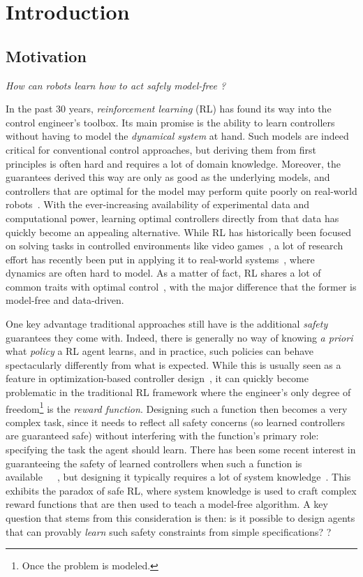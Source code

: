 \chapter{Introduction} \label{chap:intro}

\section{Motivation}
	\emph{How can robots learn how to act safely model-free ?} \par
	In the past 30 years, \emph{reinforcement learning} (RL) has found its way into the control engineer's toolbox. Its main promise is the ability to learn controllers without having to model the\emph{ dynamical system} at hand. Such models are indeed critical for conventional control approaches, but deriving them from first principles is often hard and requires a lot of domain knowledge. Moreover, the guarantees derived this way are only as good as the underlying models, and controllers that are optimal for the model may perform quite poorly on real-world robots~\needcite. With the ever-increasing availability of experimental data and computational power, learning optimal controllers directly from that data has quickly become an appealing alternative. While RL has historically been focused on solving tasks in controlled environments like video games~\needcite, a lot of research effort has recently been put in applying it to real-world systems~\needcite, where dynamics are often hard to model. As a matter of fact, RL shares a lot of common traits with optimal control~\cite{sutton1992reinforcement}, with the major difference that the former is model-free and data-driven. \par
	One key advantage traditional approaches still have is the additional\emph{ safety} guarantees they come with. Indeed, there is generally no way of knowing\emph{ a priori} what\emph{ policy} a RL agent learns, and in practice, such policies can behave spectacularly differently from what is expected. While this is usually seen as a feature in optimization-based controller design~\cite{baker2019emergent}, it can quickly become problematic in the traditional RL framework where the engineer's only degree of freedom\footnote{Once the problem is modeled.} is the\emph{ reward function}. Designing such a function then becomes a very complex task, since it needs to reflect all safety concerns (so learned controllers are guaranteed safe) without interfering with the function's primary role: specifying the task the agent should learn. There has been some recent interest in guaranteeing the safety of learned controllers when such a function is available~\cite{hans2008safe}~\cite{turchetta2016safe}~\cite{berkenkamp2016safe}, but designing it typically requires a lot of system knowledge~\needcite. This exhibits the paradox of safe RL, where system knowledge is used to craft complex reward functions that are then used to teach a model-free algorithm. A key question that stems from this consideration is then: is it possible to design agents that can provably\emph{ learn} such safety constraints from simple specifications? ?%
